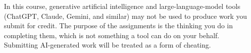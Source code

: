 In this course, generative artificial intelligence and large-language-model
tools (ChatGPT, Claude, Gemini, and similar) may not be used to produce work you
submit for credit. The purpose of the assignments is the thinking you do in
completing them, which is not something a tool can do on your behalf. Submitting
AI-generated work will be treated as a form of cheating.
